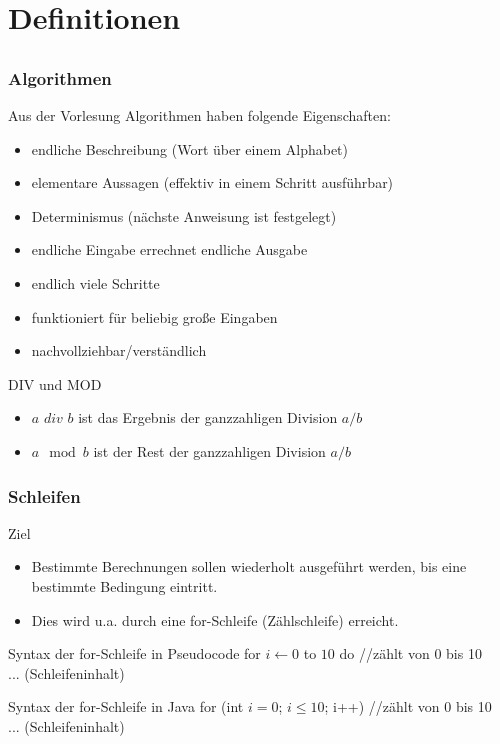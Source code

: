 \section[Definitionen]{Definitionen}
\subsection*{}
\begin{frame}
\frametitle{Algorithmen}
	\begin{block}{Aus der Vorlesung}
	Algorithmen haben folgende Eigenschaften:
	\begin{itemize}
	  \item endliche Beschreibung (Wort über einem Alphabet)
	  \item elementare Aussagen (effektiv in einem Schritt ausführbar)
	  \item Determinismus (nächste Anweisung ist festgelegt)
	  \item endliche Eingabe errechnet endliche Ausgabe
	  \item endlich viele Schritte
	  \item funktioniert für beliebig große Eingaben
	  \item nachvollziehbar/verständlich
	\end{itemize}
	\end{block}
	\begin{block}{DIV und MOD}
	\begin{itemize}
	  \item $a$ $div$ $b$ ist das Ergebnis der ganzzahligen Division $a/b$
	  \item $a \mod b$ ist der Rest der ganzzahligen Division $a/b$
	\end{itemize}
	\end{block}
\end{frame}

\begin{frame}
 	\frametitle{Schleifen} 
        \begin{block}{Ziel}
        \begin{itemize}
        	\item Bestimmte Berechnungen sollen wiederholt ausgeführt werden, bis eine bestimmte Bedingung eintritt.
        	\item Dies wird u.a. durch eine for-Schleife (Zählschleife) erreicht.
        \end{itemize}
        \end{block}
	\pause
        \begin{block}{Syntax der for-Schleife in Pseudocode}
		for $i \leftarrow 0$ to $10$ do  //zählt von 0 bis 10\\
		     ... (Schleifeninhalt)
        \end{block}
	\pause
        \begin{block}{Syntax der for-Schleife in Java}
		for (int $i=0$; $i \leq 10$; i++)  //zählt von 0 bis 10\\
		     ... (Schleifeninhalt)
        \end{block}
\end{frame}

